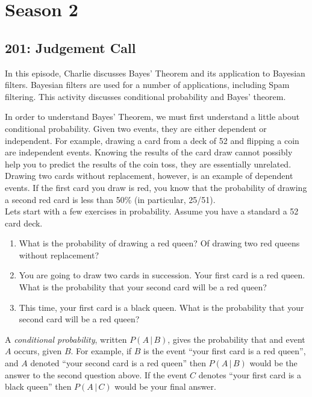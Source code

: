 \newpage
\section{Season 2}
\subsection{201: Judgement Call\label{201}}

In this episode, Charlie discusses Bayes' Theorem and its application to Bayesian filters. Bayesian filters are used for a number of applications, including Spam filtering. This activity discusses conditional probability and Bayes' theorem.


In order to understand Bayes' Theorem, we must first understand a little about conditional probability. Given two events, they are either dependent or independent. For example, drawing a card from a deck of 52 and flipping a coin are independent events. Knowing the results of the card draw cannot possibly help you to predict the results of the coin toss, they are essentially unrelated. Drawing two cards without replacement, however, is an example of dependent events. If the first card you draw is red, you know that the probability of drawing a second red card is less than 50\% (in particular, 25/51). \\

Lets start with a few exercises in probability. Assume you have a standard a 52 card deck.
	\begin{enumerate}[1.]
	\item What is the probability of drawing a red queen? Of drawing two red queens without replacement?
	\item You are going to draw two cards in succession. Your first card is a red queen. What is the probability that your second card will be a red queen?
	\item This time, your first card is a black queen. What is the probability that your second card will be a red queen?
	\end{enumerate}
	
A \emph{conditional probability}, written $P(A\,|\,B)$, gives the probability that and event $A$ occurs, given $B$. For example, if $B$ is the event ``your first card is a red queen'', and $A$ denoted ``your second card is a red queen'' then $P(A\,|\,B)$ would be the answer to the second question above. If the event $C$ denotes ``your first card is a black queen'' then $P(A\,|\,C)$ would be your final answer. \\

